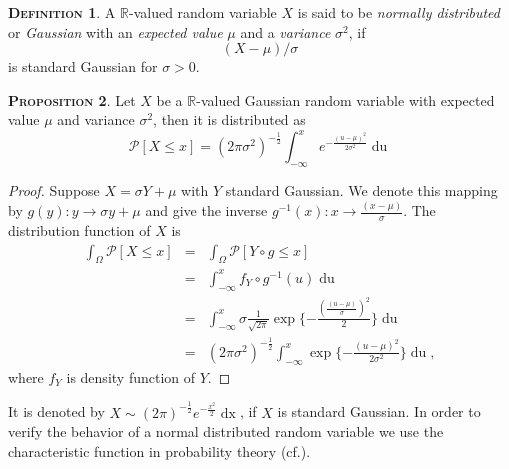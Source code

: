\documentclass[a4paper, twoside, 11pt]{article}
\theoremstyle{definition}
\newtheorem{definition}{\scshape Definition}[section]
\newtheorem{proposition}[definition]{\scshape Proposition}
\begin{document}
  \begin{definition}
	A $\mathbb{R}$-valued random variable $X$ is said to be \emph{normally distributed} or \emph{Gaussian} with an \emph{expected value} $\mu$ and a \emph{variance} $\sigma^2$, if
  \[
	(X-\mu) / \sigma
  \]
  is standard Gaussian for $\sigma>0$.
  \end{definition}

  \begin{proposition}
	Let $X$ be a $\mathbb{R}$-valued Gaussian random variable with expected value $\mu$ and variance $\sigma^2$, then it is distributed as
	\begin{equation*}
	  \mathcal{P}[X\le x] = (2\pi\sigma^2)^{-\frac{1}{2}}\int_{-\infty}^x e^{-\frac{(u-\mu)^2}{2\sigma^2}}\mathop{du}
	\end{equation*}
  \end{proposition}

  \begin{proof}
	Suppose $X = \sigma Y + \mu$ with $Y$ standard Gaussian. We denote this mapping by $g(y) : y \rightarrow \sigma y + \mu$ and give the inverse $g^{-1}(x) : x \rightarrow \frac{(x-\mu)}{\sigma}$. The distribution function of $X$ is 
	\begin{eqnarray*}
	  \int_\Omega \mathcal{P}[X \le x] &=& \int_\Omega \mathcal{P}[Y \circ g \le x] \\
	  &=& \int_{-\infty}^{x} f_Y \circ g^{-1}(u) \mathop{du}\\
	  &=& \int_{-\infty}^{x} \sigma \frac{1}{\sqrt{2\pi}} \exp\{-\frac{(\frac{(u-\mu)}{\sigma})^2}{2}\} \mathop{du}\\
	  &=&  (2\pi\sigma^2)^{-\frac{1}{2}}\int_{-\infty}^{x} \exp\{-\frac{(u-\mu)^2}{2\sigma^2}\}\mathop{du} ,
	\end{eqnarray*}
   where $f_Y$ is density function of $Y$.
  \end{proof}

  It is denoted by $X \sim (2\pi)^{-\frac{1}{2}}e^{-\frac{x^2}{2}}\mathop{dx} $, if $X$ is standard Gaussian. In order to verify the behavior of a normal distributed random variable we use the characteristic function in probability theory (cf.\cite{bauer}). 
\end{document}
